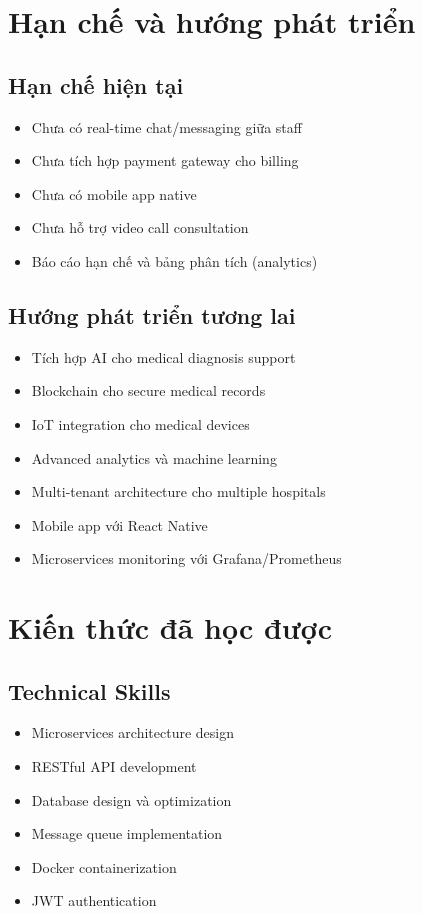 \documentclass[12pt,a4paper]{report}
\begin{document}
    \section{Hạn chế và hướng phát triển}

    \subsection{Hạn chế hiện tại}
    \begin{itemize}
        \item Chưa có real-time chat/messaging giữa staff
        \item Chưa tích hợp payment gateway cho billing
        \item Chưa có mobile app native
        \item Chưa hỗ trợ video call consultation
        \item Báo cáo hạn chế và bảng phân tích (analytics)
    \end{itemize}

    \subsection{Hướng phát triển tương lai}
    \begin{itemize}
        \item Tích hợp AI cho medical diagnosis support
        \item Blockchain cho secure medical records
        \item IoT integration cho medical devices
        \item Advanced analytics và machine learning
        \item Multi-tenant architecture cho multiple hospitals
        \item Mobile app với React Native
        \item Microservices monitoring với Grafana/Prometheus
    \end{itemize}

    \section{Kiến thức đã học được}
    \subsection{Technical Skills}
    \begin{itemize}
        \item Microservices architecture design
        \item RESTful API development
        \item Database design và optimization
        \item Message queue implementation
        \item Docker containerization
        \item JWT authentication
    \end{itemize}
\end{document}
